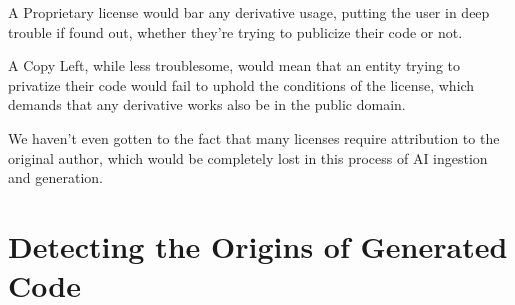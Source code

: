 \documentclass[journal]{IEEEtran}
\begin{document}
A Proprietary license would bar any derivative usage, putting the
user in deep trouble if found out, whether they're trying to publicize
their code or not.

A Copy Left, while less troublesome, would mean that an entity trying to privatize their code
would fail to uphold the conditions of the license, which demands that any derivative
works also be in the public domain.

We haven't even gotten to the fact that many licenses require attribution to the
original author, which would be completely lost in this process of AI ingestion
and generation.









\section{Detecting the Origins of Generated Code}

\end{document}
